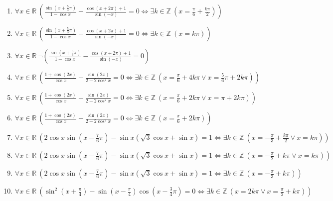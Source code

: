 \documentclass[11pt,a4paper]{article}
\begin{document}
\begin{enumerate}
\item $\displaystyle \forall x \in \mathbb{R}\ \left( \frac{\sin\left(x + \frac{5}{3}\pi\right)}{1 - \cos x} - \frac{\cos\left(x + 2\pi\right) + 1}{\sin\left(-x\right)} = 0 \iff \exists k \in \mathbb{Z}\ \left( x = \frac{\pi}{6} + \frac{k\pi}{2} \right) \right)$
\item $\displaystyle \forall x \in \mathbb{R}\ \left( \frac{\sin\left(x + \frac{5}{3}\pi\right)}{1 - \cos x} - \frac{\cos\left(x + 2\pi\right) + 1}{\sin\left(-x\right)} = 0 \iff \exists k \in \mathbb{Z}\ \left( x = k\pi \right) \right)$
\item $\displaystyle \forall x \in \mathbb{R}\ \lnot \left( \frac{\sin\left(x + \frac{5}{3}\pi\right)}{1 - \cos x} - \frac{\cos\left(x + 2\pi\right) + 1}{\sin\left(-x\right)} = 0 \right)$
\item $\displaystyle \forall x \in \mathbb{R}\ \left( \frac{1 + \cos\left(2x\right)}{\cos x} - \frac{\sin\left(2x\right)}{2 - 2\cos^{2} x} = 0 \iff \exists k \in \mathbb{Z}\ \left( x = \frac{\pi}{6} + 4k\pi \lor x = \frac{5}{6}\pi + 2k\pi \right) \right)$
\item $\displaystyle \forall x \in \mathbb{R}\ \left( \frac{1 + \cos\left(2x\right)}{\cos x} - \frac{\sin\left(2x\right)}{2 - 2\cos^{2} x} = 0 \iff \exists k \in \mathbb{Z}\ \left( x = \frac{\pi}{6} + 2k\pi \lor x = \pi + 2k\pi \right) \right)$
\item $\displaystyle \forall x \in \mathbb{R}\ \left( \frac{1 + \cos\left(2x\right)}{\cos x} - \frac{\sin\left(2x\right)}{2 - 2\cos^{2} x} = 0 \iff \exists k \in \mathbb{Z}\ \left( x = \frac{\pi}{6} + 2k\pi \right) \right)$
\item $\displaystyle \forall x \in \mathbb{R}\ \left( 2\cos x \sin\left(x - \frac{7}{6}\pi\right) - \sin x(\sqrt{3}\cos x + \sin x) = 1 \iff \exists k \in \mathbb{Z}\ \left( x = -\frac{\pi}{3} + \frac{k\pi}{2} \lor x = k\pi \right) \right)$
\item $\displaystyle \forall x \in \mathbb{R}\ \left( 2\cos x \sin\left(x - \frac{7}{6}\pi\right) - \sin x(\sqrt{3}\cos x + \sin x) = 1 \iff \exists k \in \mathbb{Z}\ \left( x = -\frac{\pi}{2} + k\pi \lor x = k\pi \right) \right)$
\item $\displaystyle \forall x \in \mathbb{R}\ \left( 2\cos x \sin\left(x - \frac{7}{6}\pi\right) - \sin x(\sqrt{3}\cos x + \sin x) = 1 \iff \exists k \in \mathbb{Z}\ \left( x = -\frac{\pi}{3} + k\pi \right) \right)$
\item $\displaystyle \forall x \in \mathbb{R}\ \left( \sin^{2}\left(x + \frac{\pi}{4}\right) - \sin\left(x - \frac{\pi}{4}\right)\cos\left(x - \frac{3}{4}\pi\right) = 0 \iff \exists k \in \mathbb{Z}\ \left( x = 2k\pi \lor x = \frac{\pi}{2} + k\pi \right) \right)$

\end{enumerate}
\end{document}
